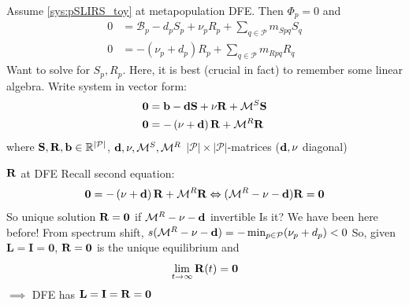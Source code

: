 \documentclass[aspectratio=43]{beamer}
\begin{document}

\begin{frame}{}
Assume \eqref{sys:pSLIRS_toy} at metapopulation DFE. Then $\Phi_p=0$ and 
\begin{align*}
0 &=\mathcal{B}_p-d_pS_p+\nu_pR_p
+\textstyle{\sum_{q\in\mathcal{P}}} m_{Spq}S_{q} \\
0 &=-\left(\nu_{p}+d_{p}\right)R_{p}
+\textstyle{\sum_{q\in\mathcal{P}}} m_{Rpq}R_{q}
\end{align*}
Want to solve for $S_p,R_p$. Here, it is best (crucial in fact) to remember some linear algebra. Write system in vector form:
\begin{align*}
\mathbf{0} &=\mathbf{b}-\mathbf{d}\mathbf{S}+\mathbf{\nu}\mathbf{R}+\mathcal{M}^S\mathbf{S} \\
\mathbf{0} &=-\left(\mathbf{\nu}+\mathbf{d}\right)\mathbf{R}+\mathcal{M}^R\mathbf{R}
\end{align*}
where $\mathbf{S},\mathbf{R},\mathbf{b}\in\mathbb{R}^{|\mathcal{P}|}$, $\mathbf{d},\mathbf{\nu},\mathcal{M}^S,\mathcal{M}^R$ $|\mathcal{P}|\times|\mathcal{P}|$-matrices ($\mathbf{d},\mathbf{\nu}$ diagonal)
\end{frame}

\begin{frame}{$\mathbf{R}$ at DFE}
Recall second equation:
$$
\mathbf{0} =-\left(\mathbf{\nu}+\mathbf{d}\right)\mathbf{R}+\mathcal{M}^R\mathbf{R} \Leftrightarrow (\mathcal{M}^R-\mathbf{\nu}-\mathbf{d})\mathbf{R}=\mathbf{0}
$$
\vfill
So unique solution $\mathbf{R}=\mathbf{0}$ if $\mathcal{M}^R-\mathbf{\nu}-\mathbf{d}$ invertible
Is it?
\vfill
We have been here before! 
\vfill
From spectrum shift, $s(\mathcal{M}^R-\mathbf{\nu}-\mathbf{d})=-\min_{p\in\mathcal{P}}(\nu_p+d_p)<0$
\vfill
So, given $\mathbf{L}=\mathbf{I}=\mathbf{0}$, $\mathbf{R}=\mathbf{0}$ is the unique equilibrium and
$$
\lim_{t\to\infty}\mathbf{R}(t)=\mathbf{0}
$$
\vfill
$\implies$ DFE has $\mathbf{L}=\mathbf{I}=\mathbf{R}=\mathbf{0}$
\end{frame}
\end{document}

